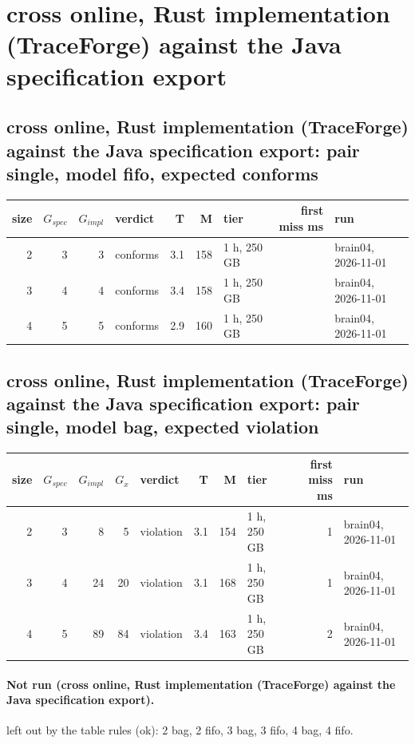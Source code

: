 \documentclass[10pt]{article}
\begin{document}
\section*{cross online, Rust implementation (TraceForge) against the Java specification export}
\subsection*{cross online, Rust implementation (TraceForge) against the Java specification export: pair \textsf{single}, model fifo, expected conforms}
\begin{longtable}{@{}rrrlrrlrl@{}}
\toprule
size & $G_{\mathit{spec}}$ & $G_{\mathit{impl}}$ & verdict & T & M & tier & first miss ms & run \\
\midrule
\endhead
\color{red} 2 & 3 & 3 & conforms & 3.1 & 158 & 1 h, 250 GB &  & brain04, 2026-11-01 \\
\color{red} 3 & 4 & 4 & conforms & 3.4 & 158 & 1 h, 250 GB &  & brain04, 2026-11-01 \\
\color{red} 4 & 5 & 5 & conforms & 2.9 & 160 & 1 h, 250 GB &  & brain04, 2026-11-01 \\
\bottomrule
\end{longtable}
\subsection*{cross online, Rust implementation (TraceForge) against the Java specification export: pair \textsf{single}, model bag, expected violation}
\begin{longtable}{@{}rrrrlrrlrl@{}}
\toprule
size & $G_{\mathit{spec}}$ & $G_{\mathit{impl}}$ & $G_x$ & verdict & T & M & tier & first miss ms & run \\
\midrule
\endhead
\color{red} 2 & 3 & 8 & 5 & violation & 3.1 & 154 & 1 h, 250 GB & 1 & brain04, 2026-11-01 \\
\color{red} 3 & 4 & 24 & 20 & violation & 3.1 & 168 & 1 h, 250 GB & 1 & brain04, 2026-11-01 \\
\color{red} 4 & 5 & 89 & 84 & violation & 3.4 & 163 & 1 h, 250 GB & 2 & brain04, 2026-11-01 \\
\bottomrule
\end{longtable}
\paragraph{Not run (cross online, Rust implementation (TraceForge) against the Java specification export).}
left out by the table rules (ok): 2 bag, 2 fifo, 3 bag, 3 fifo, 4 bag, 4 fifo.\par
\end{document}
